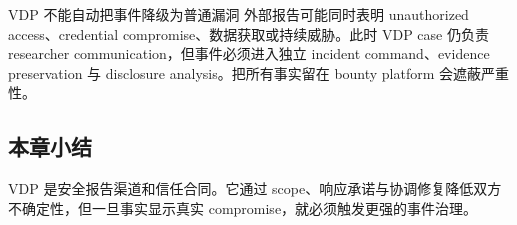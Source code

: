 
\begin{warningbox}{VDP 不能自动把事件降级为普通漏洞}
外部报告可能同时表明 unauthorized access、credential compromise、数据获取或持续威胁。此时 VDP case 仍负责 researcher communication，但事件必须进入独立 incident command、evidence preservation 与 disclosure analysis。把所有事实留在 bounty platform 会遮蔽严重性。
\end{warningbox}

\subsection{本章小结}

VDP 是安全报告渠道和信任合同。它通过 scope、响应承诺与协调修复降低双方不确定性，但一旦事实显示真实 compromise，就必须触发更强的事件治理。

